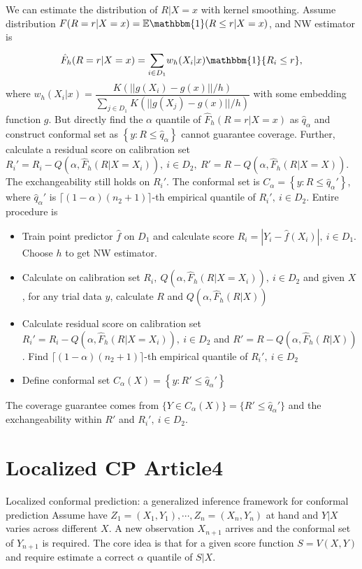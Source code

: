 \documentclass[12pt, a4paper, oneside]{article}
\begin{document}
    
    We can estimate the distribution of $R|X=x$ with kernel smoothing. Assume distribution $F(R=r|X=x)=\mathbb{E}\mathbbm{1}(R\leq r|X=x)$, and NW estimator is
    \begin{equation*}
        \hat{F}_h(R=r|X=x)=\overset{}{\underset{i\in D_1}\sum}w_h(X_i|x)\mathbbm{1}\{R_i\leq r\},
    \end{equation*}
    where $w_h(X_i|x)=\dfrac{K(||g(X_i)-g(x)||/h)}{\overset{}{\underset{j\in D_1}\sum}K(||g(X_j)-g(x)||/h)}$ with some embedding function $g$. But directly find the $\alpha$ quantile of $\hat{F}_h(R=r|X=x)$ as $\hat{q}_\alpha$ and construct conformal set as $\left\{ y:R\leq \hat{q}_\alpha \right\}$ cannot guarantee coverage. Further, calculate a residual score on calibration set $R_i'=R_i-Q(\alpha,\hat{F}_h(R|X=X_i)),\ i\in D_2,\ R'=R-Q(\alpha,\hat{F}_h(R|X=X))$. The exchangeability still holds on $R_i'$. The conformal set is $C_\alpha=\left\{ y:R\leq\hat{q}_\alpha' \right\}$, where $\hat{q}_\alpha'$ is $\lceil(1-\alpha)(n_2+1)\rceil$-th empirical quantile of $R_i',\ i\in D_2$. Entire procedure is
    \begin{itemize}
        \item Train point predictor $\hat{f}$ on $D_1$ and calculate score $R_i=|Y_i-\hat{f}(X_i)|,\ i\in D_1$. Choose $h$ to get NW estimator.
        \item Calculate on calibration set $R_i,\ Q(\alpha,\hat{F}_h(R|X=X_i)),\ i\in D_2$ and given $X$, for any trial data $y$, calculate $R$ and $Q(\alpha,\hat{F}_h(R|X))$
        \item Calculate residual score on calibration set $R_i'=R_i-Q(\alpha,\hat{F}_h(R|X=X_i)),\ i\in D_2$ and $R'=R-Q(\alpha,\hat{F}_h(R|X))$. Find $\lceil(1-\alpha)(n_2+1)\rceil$-th empirical quantile of $R_i',\ i\in D_2$
        \item Define conformal set $C_\alpha(X)=\left\{ y:R'\leq\hat{q}_\alpha' \right\}$
    \end{itemize}


    The coverage guarantee comes from $\{Y\in C_\alpha(X)\}=\{R'\leq\hat{q}_\alpha'\}$ and the exchangeability within $R'$ and $R_i',\ i\in D_2$.


\section{Localized CP Article4}
    Localized conformal prediction: a generalized inference framework for conformal prediction\cite{guan2023localized}
    Assume have $Z_1=(X_1,Y_1),\cdots,Z_n=(X_n,Y_n)$ at hand and $Y|X$ varies across different $X$. A new observation $X_{n+1}$ arrives and the conformal set of $Y_{n+1}$ is required. The core idea is that for a given score function $S=V(X,Y)$ and require estimate a correct $\alpha$ quantile of $S|X$.
    
\end{document}
